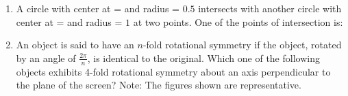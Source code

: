 \documentclass[journal,12pt,onecolumn]{article}
\theoremstyle{remark}
\begin{document}
\begin{enumerate}
\item A circle with center at  =  and radius = $0.5$ intersects with another circle with center at  =  and radius = $1$ at two points. One of the points of intersection  is:

\hfill{}
\begin{enumerate}
\end{enumerate}

\item An object is said to have an $n$-fold rotational symmetry if the object, rotated by an angle of $\frac{2\pi}{n}$, is identical to the original. Which one of the following objects exhibits 4-fold rotational symmetry about an axis perpendicular to the plane of the screen?
Note: The figures shown are representative.


\end{enumerate}
\end{document}
